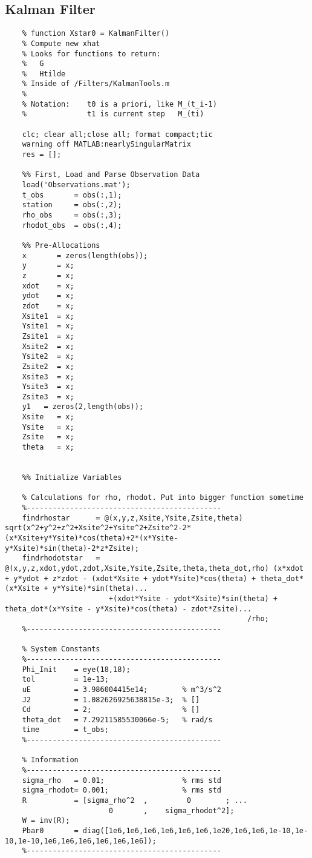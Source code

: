 \documentclass[12pt,a4paper,oneside]{article}
\numberwithin{equation}{section}   		%
\begin{document}
\begin{appendices}
\chapter{Kalman Filter}
\label{app:Kalman}
\begin{lstlisting}
	% function Xstar0 = KalmanFilter()
	% Compute new xhat
	% Looks for functions to return:
	%   G
	%   Htilde
	% Inside of /Filters/KalmanTools.m
	%
	% Notation:    t0 is a priori, like M_(t_i-1)
	%              t1 is current step   M_(ti)
	
	clc; clear all;close all; format compact;tic
	warning off MATLAB:nearlySingularMatrix
	res = [];
	
	%% First, Load and Parse Observation Data
	load('Observations.mat');
	t_obs       = obs(:,1);
	station     = obs(:,2);
	rho_obs     = obs(:,3);
	rhodot_obs  = obs(:,4);
	
	%% Pre-Allocations
	x       = zeros(length(obs));
	y       = x;
	z       = x;
	xdot    = x;
	ydot    = x;
	zdot    = x;
	Xsite1  = x;
	Ysite1  = x;
	Zsite1  = x;
	Xsite2  = x;
	Ysite2  = x;
	Zsite2  = x;
	Xsite3  = x;
	Ysite3  = x;
	Zsite3  = x;
	y1   = zeros(2,length(obs));
	Xsite   = x;
	Ysite   = x;
	Zsite   = x;
	theta   = x;
	
	
	%% Initialize Variables
	
	% Calculations for rho, rhodot. Put into bigger functiom sometime
	%---------------------------------------------
	findrhostar      = @(x,y,z,Xsite,Ysite,Zsite,theta) sqrt(x^2+y^2+z^2+Xsite^2+Ysite^2+Zsite^2-2*(x*Xsite+y*Ysite)*cos(theta)+2*(x*Ysite-y*Xsite)*sin(theta)-2*z*Zsite);
	findrhodotstar   = @(x,y,z,xdot,ydot,zdot,Xsite,Ysite,Zsite,theta,theta_dot,rho) (x*xdot + y*ydot + z*zdot - (xdot*Xsite + ydot*Ysite)*cos(theta) + theta_dot*(x*Xsite + y*Ysite)*sin(theta)...
	                    +(xdot*Ysite - ydot*Xsite)*sin(theta) + theta_dot*(x*Ysite - y*Xsite)*cos(theta) - zdot*Zsite)...
	                                                    /rho;
	%---------------------------------------------
	
	% System Constants
	%---------------------------------------------
	Phi_Init    = eye(18,18);
	tol         = 1e-13;
	uE          = 3.986004415e14;        % m^3/s^2
	J2          = 1.082626925638815e-3;  % []
	Cd          = 2;                     % []
	theta_dot   = 7.29211585530066e-5;   % rad/s
	time        = t_obs;
	%---------------------------------------------
	
	% Information
	%---------------------------------------------
	sigma_rho   = 0.01;                  % rms std
	sigma_rhodot= 0.001;                 % rms std
	R           = [sigma_rho^2  ,         0        ; ...
	                    0       ,    sigma_rhodot^2];
	W = inv(R);                
	Pbar0       = diag([1e6,1e6,1e6,1e6,1e6,1e6,1e20,1e6,1e6,1e-10,1e-10,1e-10,1e6,1e6,1e6,1e6,1e6,1e6]);
	%---------------------------------------------
	

\end{lstlisting}
\end{appendices}
\end{document}
